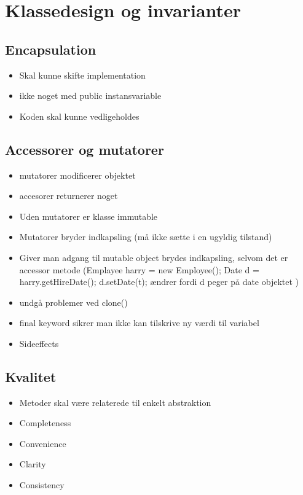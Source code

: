 \newpage
\section{Klassedesign og invarianter} %
\label{sec:klassedesign_og_invarianter}
\subsection{Encapsulation} %
\label{sub:encapsulation}
\begin{itemize}
    \item Skal kunne skifte implementation
    \item ikke noget med public instansvariable
    \item Koden skal kunne vedligeholdes
\end{itemize}
\subsection{Accessorer og mutatorer} %
\label{sub:accessorer_og_mutatorer}
\begin{itemize}
    \item mutatorer modificerer objektet
    \item accesorer returnerer noget
    \item Uden mutatorer er klasse immutable
    \item Mutatorer bryder indkapsling (må ikke sætte i en ugyldig tilstand)
    \item Giver man adgang til mutable object brydes indkapsling, selvom det er accessor metode (Emplayee harry = new Employee(); Date d = harry.getHireDate(); d.setDate(t); ændrer fordi d peger på date objektet )
    \item undgå problemer ved clone()
    \item final keyword sikrer man ikke kan tilskrive ny værdi til variabel
    \item Sideeffects
\end{itemize}
\subsection{Kvalitet} %
\label{sub:kvalitet}
\begin{itemize}
    \item Metoder skal være relaterede til enkelt abstraktion
    \item Completeness
    \item Convenience
    \item Clarity
    \item Consistency
\end{itemize}
